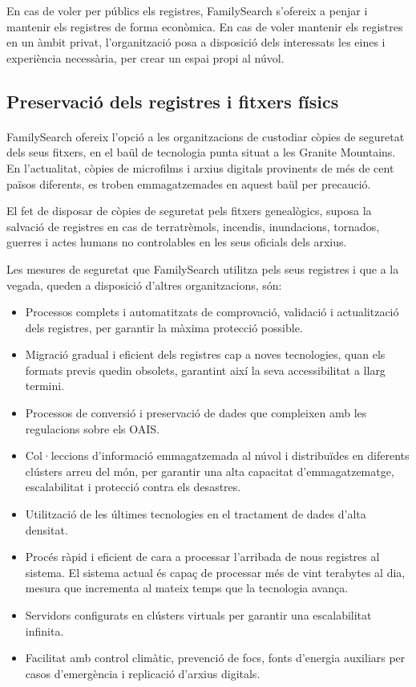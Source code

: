     En cas de voler per públics els registres, FamilySearch s’ofereix a penjar i mantenir els registres de forma econòmica. En cas de voler mantenir els registres en un àmbit privat, l’organització posa a disposició dels interessats les eines i experiència necessària, per crear un espai propi al núvol.


    \subsection{Preservació dels registres i fitxers físics}

    \paragraph{}
    FamilySearch ofereix l’opció a les organitzacions de custodiar còpies de seguretat dels seus fitxers, en el baül de tecnologia punta situat a les Granite Mountains. En l'actualitat, còpies de microfilms i arxius digitals provinents de més de cent països diferents, es troben emmagatzemades en aquest baül per precaució.

    El fet de disposar de còpies de seguretat pels fitxers genealògics, suposa la salvació de registres en cas de terratrèmols, incendis, inundacions, tornados, guerres i actes humans no controlables en les seus oficials dels arxius.

    Les mesures de seguretat que FamilySearch utilitza pels seus registres i que a la vegada, queden a disposició d’altres organitzacions, són:

    \begin{itemize}
        \item Processos complets i automatitzats de comprovació, validació i actualització dels registres, per garantir la màxima protecció possible.
        \item Migració gradual i eficient dels registres cap a noves tecnologies, quan els formats previs quedin obsolets, garantint així la seva accessibilitat a llarg termini.
        \item Processos de conversió i preservació de dades que compleixen amb les regulacions sobre els \gls{OAIS}.
        \item Col·leccions d’informació emmagatzemada al núvol i distribuïdes en diferents clústers arreu del món, per garantir una alta capacitat d’emmagatzematge, escalabilitat i protecció contra els desastres.
        \item Utilització de les últimes tecnologies en el tractament de dades d'alta densitat.
        \item Procés ràpid i eficient de cara a processar l'arribada de nous registres al sistema. El sistema actual és capaç de processar més de vint terabytes al dia, mesura que incrementa al mateix temps que la tecnologia avança.
        \item Servidors configurats en clústers virtuals per garantir una escalabilitat infinita.
        \item Facilitat amb control climàtic, prevenció de focs, fonts d’energia auxiliars per casos d’emergència i replicació d’arxius digitals.
    \end{itemize}



